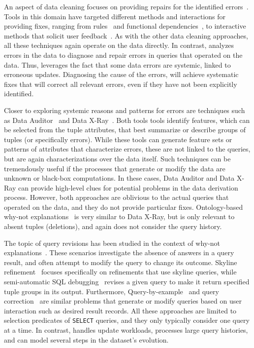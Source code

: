 An aspect of data cleaning focuses on providing repairs for the
identified errors~\cite{ChuIP13}. Tools in this domain have targeted
different methods and interactions for providing fixes, ranging from
rules~\cite{Beskales2010, Cong2007
} and functional
dependencies~\cite{Fan2008b, ChuIP13
}, to interactive methods that
solicit user feedback~\cite{Yakout, Raman01
}. As with the other data
cleaning approaches, all these techniques again operate on the data
directly. In contrast, \sys analyzes errors in the data to diagnose
and repair errors in queries that operated on the data. Thus, \sys
leverages the fact that some data errors are systemic, linked to
erroneous updates. Diagnosing the cause of the errors, will achieve
systematic fixes that will correct all relevant errors, even if they
have not been explicitly identified.

Closer to exploring systemic reasons and patterns for errors are
techniques such as Data Auditor~\cite{GolabKKS10, Golab2008
} and Data
X-Ray~\cite{wang2015}. Both tools tools identify features, which can
be selected from the tuple attributes, that best summarize or describe
groups of tuples (or specifically errors). While these tools can
generate feature sets or patterns of attributes that characterize
errors, these are not linked to the queries, but are again
characterizations over the data itself. Such techniques can be
tremendously useful if the processes that generate or modify the data
are unknown or black-box computations. In these cases, Data Auditor
and Data X-Ray can provide high-level clues for potential problems in
the data derivation process. However, both approaches are oblivious to
the actual queries that operated on the data, and they do not provide
particular fixes. Ontology-based why-not
explanations~\cite{tenCate2015} is very similar to Data X-Ray, but is
only relevant to absent tuples (deletions), and again does not
consider the query history.

The topic of query revisions has been studied in the context of
why-not explanations~\cite{Chapman2009}. These scenarios investigate
the absence of answers in a query result, and often attempt to modify
the query to change its outcome. Skyline
refinement~\cite{tran2010conquer} focuses specifically on refinements
that use skyline queries, while semi-automatic SQL
debugging~\cite{tzompanaki14semi} revises a given query to make it
return specified tuple groups in its output.  Furthermore, Query-by-example~\cite{zloof1977query} 
and query correction~\cite{abouzied2012dataplay} are similar problems that generate or modify
queries based on user interaction such as desired result records.
All these approaches are
limited to selection predicates of \texttt{SELECT} queries, and they
only typically consider one query at a time. In contrast, \sys handles
update workloads, processes large query histories, and can model
several steps in the dataset's evolution. 

